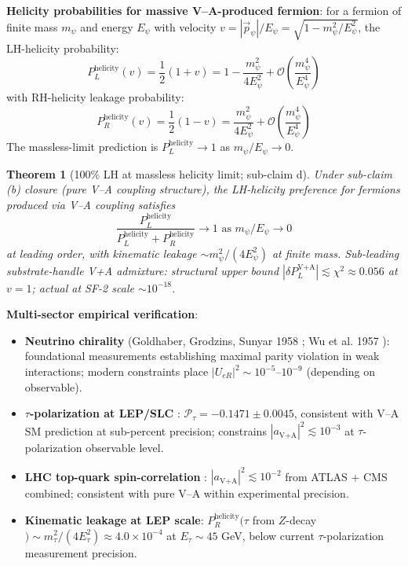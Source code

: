 \documentclass[11pt,letterpaper]{article}
\newtheorem{theorem}{Theorem}[section]
\begin{document}
\textbf{Helicity probabilities for massive V--A-produced fermion}: for a fermion of finite mass $m_\psi$ and energy $E_\psi$ with velocity $v = |\vec{p}_\psi|/E_\psi = \sqrt{1 - m_\psi^2/E_\psi^2}$, the LH-helicity probability:
\begin{equation}
P_L^{\text{helicity}}(v) = \frac{1}{2}(1 + v) = 1 - \frac{m_\psi^2}{4 E_\psi^2} + \mathcal{O}\left(\frac{m_\psi^4}{E_\psi^4}\right)
\label{eq:P_L_helicity}
\end{equation}
with RH-helicity leakage probability:
\begin{equation}
P_R^{\text{helicity}}(v) = \frac{1}{2}(1 - v) = \frac{m_\psi^2}{4 E_\psi^2} + \mathcal{O}\left(\frac{m_\psi^4}{E_\psi^4}\right)
\label{eq:P_R_helicity}
\end{equation}
The massless-limit prediction is $P_L^{\text{helicity}} \to 1$ as $m_\psi/E_\psi \to 0$.

\begin{theorem}[100\% LH at massless helicity limit; sub-claim d]
\label{thm:massless_lh}
Under sub-claim (b) closure (pure V--A coupling structure), the LH-helicity preference for fermions produced via V--A coupling satisfies
\begin{equation}
\boxed{\frac{P_L^{\text{helicity}}}{P_L^{\text{helicity}} + P_R^{\text{helicity}}} \to 1 \text{ as } m_\psi/E_\psi \to 0}
\label{eq:massless_lh_limit}
\end{equation}
at leading order, with kinematic leakage $\sim m_\psi^2/(4 E_\psi^2)$ at finite mass. Sub-leading substrate-handle V+A admixture: structural upper bound $|\delta P_L^{\text{V+A}}| \lesssim \chi^2 \approx 0.056$ at $v=1$; actual at SF-2 scale $\sim 10^{-18}$.
\end{theorem}

\textbf{Multi-sector empirical verification}:

\begin{itemize}[leftmargin=*]
\item \textbf{Neutrino chirality} (Goldhaber, Grodzins, Sunyar 1958 \cite{Goldhaber1958}; Wu et al. 1957 \cite{Wu1957}): foundational measurements establishing maximal parity violation in weak interactions; modern constraints place $|U_{eR}|^2 \sim 10^{-5}$--$10^{-9}$ (depending on observable).
\item \textbf{$\tau$-polarization at LEP/SLC} \cite{LEPElectroweak}: $\mathcal{P}_\tau = -0.1471 \pm 0.0045$, consistent with V--A SM prediction at sub-percent precision; constrains $|a_{\text{V+A}}|^2 \lesssim 10^{-3}$ at $\tau$-polarization observable level.
\item \textbf{LHC top-quark spin-correlation} \cite{ATLASTopSpin, CMSTopSpin}: $|a_{\text{V+A}}|^2 \lesssim 10^{-2}$ from ATLAS + CMS combined; consistent with pure V--A within experimental precision.
\item \textbf{Kinematic leakage at LEP scale}: $P_R^{\text{helicity}}(\tau$ from $Z$-decay$) \sim m_\tau^2/(4 E_\tau^2) \approx 4.0 \times 10^{-4}$ at $E_\tau \sim 45$ GeV, below current $\tau$-polarization measurement precision.
\end{itemize}
\end{document}

